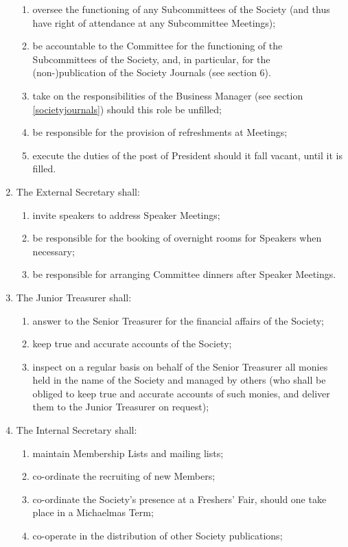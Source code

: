 \documentclass{article}
\begin{document}
\begin{enumerate}
\begin{enumerate}
  \item oversee the functioning of any Subcommittees of the Society (and
  thus have right of attendance at any Subcommittee Meetings);
  \item be accountable to the Committee for the functioning of the Subcommittees of the Society, and, in particular, for the (non-)publication
  of the Society Journals (see section 6).
  \item take on the responsibilities of the Business Manager (see section \ref{societyjournals}) should this role be unfilled;
  \item be responsible for the provision of refreshments at Meetings;
  \item execute the duties of the post of President should it fall vacant, until
  it is filled.
  \end{enumerate}
\item The External Secretary shall:
  \begin{enumerate}
  \item invite speakers to address Speaker Meetings;
  \item be responsible for the booking of overnight rooms for Speakers when
  necessary;
  \item be responsible for arranging Committee dinners after Speaker Meetings.
  \end{enumerate}
\item The Junior Treasurer shall:
  \begin{enumerate}
  \item answer to the Senior Treasurer for the financial affairs of the Society;
  \item keep true and accurate accounts of the Society;
  \item inspect on a regular basis on behalf of the Senior Treasurer all monies
  held in the name of the Society and managed by others (who shall
  be obliged to keep true and accurate accounts of such monies, and
  deliver them to the Junior Treasurer on request);
  \end{enumerate}
\item The Internal Secretary shall:
  \begin{enumerate}
  \item maintain Membership Lists and mailing lists;
  \item co-ordinate the recruiting of new Members;
  \item co-ordinate the Society's presence at a Freshers' Fair, should one take
  place in a Michaelmas Term;
  \item co-operate in the distribution of other Society publications;

\end{enumerate}
\end{enumerate}
\end{document}
